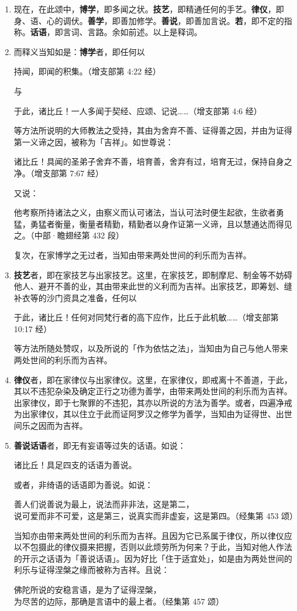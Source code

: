 \begin{enumerate}\item 现在，在此颂中，\textbf{博学}，即多闻之状。\textbf{技艺}，即精通任何的手艺。\textbf{律仪}，即身、语、心的调伏。\textbf{善学}，即善加修学。\textbf{善说}，即善加言说。\textbf{若}，即不定的指称。\textbf{话语}，即言词、言路。余如前述。以上是释词。
\item 而释义当知如是：\textbf{博学}者，即任何以\begin{quoting}持闻，即闻的积集。（增支部第 4:22 经）\end{quoting}与\begin{quoting}于此，诸比丘！一人多闻于契经、应颂、记说……（增支部第 4:6 经）\end{quoting}等方法所说明的大师教法之受持，其由为舍弃不善、证得善之因，并由为证得第一义谛之因，被称为「吉祥」。如世尊说：\begin{quoting}诸比丘！具闻的圣弟子舍弃不善，培育善，舍弃有过，培育无过，保持自身之净。（增支部第 7:67 经）\end{quoting}又说：\begin{quoting}他考察所持诸法之义，由察义而认可诸法，当认可法时便生起欲，生欲者勇猛，勇猛者衡量，衡量者精勤，精勤者以身作证第一义谛，且以慧通达而得见之。（中部·瞻翅经第 432 段）\end{quoting}复次，在家博学之无过者，当知由带来两处世间的利乐而为吉祥。
\item \textbf{技艺}者，即在家技艺与出家技艺。这里，在家技艺，即制摩尼、制金等不妨碍他人、避开不善的业，其由带来此世的义利而为吉祥。出家技艺，即筹划、缝补衣等的沙门资具之准备，任何以\begin{quoting}于此，诸比丘！任何对同梵行者的高下应作，比丘于此机敏……（增支部第 10:17 经）\end{quoting}等方法所随处赞叹，以及所说的「作为依怙之法」，当知由为自己与他人带来两处世间的利乐而为吉祥。
\item \textbf{律仪}者，即在家律仪与出家律仪。这里，在家律仪，即戒离十不善道，于此，其以不违犯杂染及确定正行之功德为善学，由带来两处世间的利乐而为吉祥。出家律仪，即于七聚罪的不违犯，其亦以所说的方法为善学。或者，四遍净戒为出家律仪，其以住立于此而证阿罗汉之修学为善学，当知由为证得世、出世间乐之因而为吉祥。
\item \textbf{善说话语}者，即无有妄语等过失的话语。如说：\begin{quoting}诸比丘！具足四支的话语为善说。\end{quoting}或者，非绮语的话语即为善说。如说：\begin{quoting}善人们说善说为最上，说法而非非法，这是第二，\\说可爱而非不可爱，这是第三，说真实而非虚妄，这是第四。（经集第 453 颂）\end{quoting}当知亦由带来两处世间的利乐而为吉祥。且因为它已系属于律仪，所以律仪应以不包摄此的律仪摄来把握，否则以此烦劳所为何来？于此，当知对他人作法的开示之话语为「善说话语」。因为好比「住于适宜处」，如是由为两处世间的利乐与证得涅槃之缘而被称为吉祥。且说：\begin{quoting}佛陀所说的安稳言语，是为了证得涅槃，\\为尽苦的边际，那确是言语中的最上者。（经集第 457 颂）\end{quoting}

\end{enumerate}
